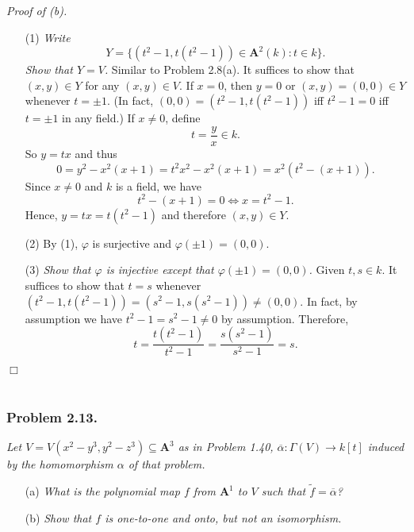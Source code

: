 \documentclass{article}
\begin{document}
\emph{Proof of (b).}
\begin{enumerate}
\item[(1)]
  \emph{Write
  \[
    Y = \{ (t^2-1, t(t^2-1)) \in \mathbf{A}^2(k) : t \in k \}.
  \]
  Show that $Y = V$.}
  Similar to Problem 2.8(a).
  It suffices to show that $(x,y) \in Y$ for any $(x,y) \in V$.
  If $x = 0$, then $y = 0$ or $(x,y) = (0,0) \in Y$ whenever $t = \pm 1$.
  (In fact, $(0,0) = (t^2-1, t(t^2-1))$ iff $t^2-1 = 0$ iff $t = \pm 1$ in any field.)
  If $x \neq 0$, define
  \[
    t = \frac{y}{x} \in k.
  \]
  So $y = tx$ and thus
  \[
    0 = y^2 - x^2(x+1) = t^2 x^2 - x^2(x+1) = x^2(t^2 - (x+1)).
  \]
  Since $x \neq 0$ and $k$ is a field, we have
  \[
    t^2 - (x+1) = 0
    \Longleftrightarrow x = t^2 - 1.
  \]
  Hence, $y = tx = t(t^2 - 1)$ and therefore $(x,y) \in Y$.

\item[(2)]
  By (1), $\varphi$ is surjective and $\varphi(\pm 1) = (0,0)$.

\item[(3)]
  \emph{Show that $\varphi$ is injective except that $\varphi(\pm 1) = (0, 0)$.}
  Given $t, s \in k$.
  It suffices to show that $t = s$
  whenever $(t^2-1, t(t^2-1)) = (s^2-1, s(s^2-1)) \neq (0,0)$.
  In fact, by assumption we have $t^2-1 = s^2-1 \neq 0$ by assumption.
  Therefore,
  \[
    t = \frac{t(t^2-1)}{t^2-1} = \frac{s(s^2-1)}{s^2-1} = s.
  \]
\end{enumerate}
$\Box$ \\\\






\subsubsection*{Problem 2.13.}
\emph{Let $V = V(x^2-y^3, y^2-z^3) \subseteq \mathbf{A}^3$ as in Problem 1.40,
$\overline{\alpha}: \Gamma(V) \to k[t]$ induced by the homomorphism $\alpha$ of that problem.}
\begin{enumerate}
\item[(a)]
  \emph{What is the polynomial map $f$ from $\mathbf{A}^1$ to $V$ such that
  $\widetilde{f} = \overline{\alpha}$?}

\item[(b)]
  \emph{Show that $f$ is one-to-one and onto, but not an isomorphism.} \\
\end{enumerate}
\end{document}
